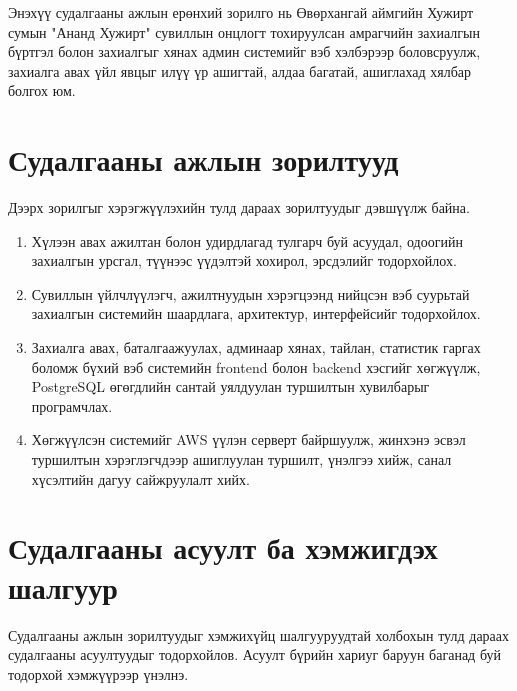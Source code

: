 Энэхүү судалгааны ажлын ерөнхий зорилго нь Өвөрхангай аймгийн Хужирт сумын "Ананд Хужирт" сувиллын онцлогт тохируулсан амрагчийн захиалгын бүртгэл болон захиалгыг хянах админ системийг вэб хэлбэрээр боловсруулж, захиалга авах үйл явцыг илүү үр ашигтай, алдаа багатай, ашиглахад хялбар болгох юм.

\section{Судалгааны ажлын зорилтууд}

Дээрх зорилгыг хэрэгжүүлэхийн тулд дараах зорилтуудыг дэвшүүлж байна.

\begin{enumerate}
    \item Хүлээн авах ажилтан болон удирдлагад тулгарч буй асуудал, одоогийн захиалгын урсгал, түүнээс үүдэлтэй хохирол, эрсдэлийг тодорхойлох.
    \item Сувиллын үйлчлүүлэгч, ажилтнуудын хэрэгцээнд нийцсэн вэб суурьтай захиалгын системийн шаардлага, архитектур, интерфейсийг тодорхойлох.
    \item Захиалга авах, баталгаажуулах, админаар хянах, тайлан, статистик гаргах боломж бүхий вэб системийн frontend болон backend хэсгийг хөгжүүлж, PostgreSQL өгөгдлийн сантай уялдуулан туршилтын хувилбарыг програмчлах.
    \item Хөгжүүлсэн системийг AWS үүлэн серверт байршуулж, жинхэнэ эсвэл туршилтын хэрэглэгчдээр ашиглуулан туршилт, үнэлгээ хийж, санал хүсэлтийн дагуу сайжруулалт хийх.
\end{enumerate}
\section{Судалгааны асуулт ба хэмжигдэх шалгуур}

Судалгааны ажлын зорилтуудыг хэмжихүйц шалгууруудтай холбохын тулд дараах судалгааны асуултуудыг тодорхойлов. Асуулт бүрийн хариуг баруун баганад буй тодорхой хэмжүүрээр үнэлнэ.

